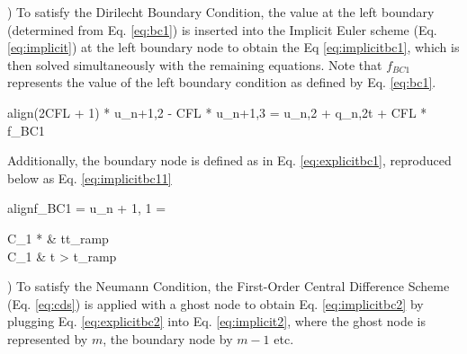 \documentclass[10pt, letter, showtrims]{extarticle}
\newcommand{\boxedeq}[2]{\begin{empheq}[box={\fboxsep=6pt\fbox}]{align}\label{#1}#2\end{empheq}}
\begin{document}
		) To satisfy the Dirilecht Boundary Condition, the value at the left boundary (determined from Eq. \ref{eq:bc1}) is inserted into the Implicit Euler scheme (Eq. \ref{eq:implicit}) at the left boundary node to obtain the Eq \ref{eq:implicitbc1}, which is then solved simultaneously with the remaining equations. Note that $f_{BC1}$ represents the value of the left boundary condition as defined by Eq. \ref{eq:bc1}.
%		 
%		
%    		
       					
		\boxedeq{eq:implicitbc1}{(2CFL + 1) * u_{n+1,2} - CFL * u_{n+1,3} = u_{n,2} + q_{n,2}\Delta t + CFL * f_{BC1}} 
		
		\noindent
		Additionally, the boundary node is defined as in Eq. \ref{eq:explicitbc1}, reproduced below as Eq. \ref{eq:implicitbc11}
		
		\boxedeq{eq:implicitbc11}{f_{BC1} = u_{n + 1, 1} = \begin{cases} 
          			C_{1} * \frac{t}{t_{ramp}} & t\leq t_{ramp} \\
          			C_{1}                      & t > t_{ramp}
       			\end{cases}}
		
		) To satisfy the Neumann Condition, the First-Order Central Difference Scheme (Eq. \ref{eq:cds}) is applied with a ghost node to obtain Eq. \ref{eq:implicitbc2} by plugging Eq. \ref{eq:explicitbc2} into Eq. \ref{eq:implicit2}, where the ghost node is represented by $m$, the boundary node by $m - 1$ etc.
		
\end{document}
